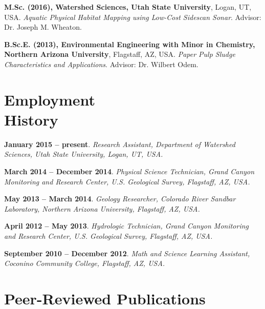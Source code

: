 \documentclass[margin,line]{resume}
\begin{document}
\begin{resume}
\begin{footnotesize}
    {\bf M.Sc. (2016), Watershed Sciences, Utah State University}, Logan, UT, USA. {\sl Aquatic Physical Habitat Mapping using Low-Cost Sidescan Sonar}. Advisor:  Dr. Joseph M. Wheaton.\vspace{2mm}

    {\bf B.Sc.E. (2013), Environmental Engineering with Minor in Chemistry, Northern Arizona University}, Flagstaff, AZ, USA.  {\sl Paper Pulp Sludge Characteristics and Applications}. Advisor:  Dr. Wilbert Odem. \vspace{2mm}
     \end{footnotesize}

    \section{\mysidestyle Employment\\History}
    \begin{footnotesize}

    {\bf January 2015 -- present}. {\sl Research Assistant, Department of Watershed Sciences, Utah State University, Logan, UT, USA.}
    
    {\bf March 2014 -- December 2014}. {\sl Physical Science Technician, Grand Canyon Monitoring and Research Center, U.S. Geological Survey, Flagstaff, AZ, USA.}

    {\bf May 2013 -- March 2014}. {\sl Geology Researcher, Colorado River Sandbar Laboratory, Northern Arizona University, Flagstaff, AZ, USA.}
    
    {\bf April 2012 -- May 2013}. {\sl Hydrologic Technician, Grand Canyon Monitoring and Research Center, U.S. Geological Survey, Flagstaff, AZ, USA.}
 
    {\bf September 2010 -- December 2012}. {\sl Math and Science Learning Assistant, Coconino Community College, Flagstaff, AZ, USA.}    
    
        \end{footnotesize}

    \section{\mysidestyle Peer-Reviewed Publications}

    \begin{footnotesize}


\end{footnotesize}
\end{resume}
\end{document}
